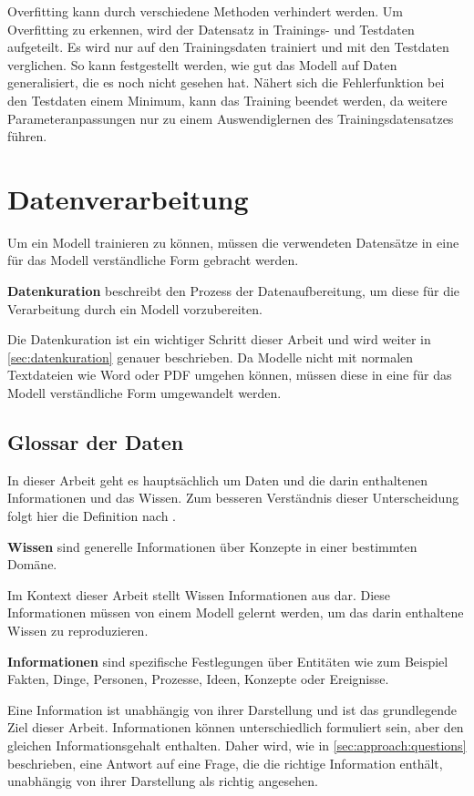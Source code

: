 Overfitting kann durch verschiedene Methoden verhindert werden.
Um Overfitting zu erkennen, wird der Datensatz in Trainings- und Testdaten aufgeteilt.
Es wird nur auf den Trainingsdaten trainiert und mit den Testdaten verglichen.
So kann festgestellt werden, wie gut das Modell auf Daten generalisiert, die es noch nicht gesehen hat.
Nähert sich die Fehlerfunktion bei den Testdaten einem Minimum, kann das Training beendet werden, da weitere Parameteranpassungen nur zu einem Auswendiglernen des Trainingsdatensatzes führen.\\


\section{Datenverarbeitung}\label{sec:datenverarbeitung}
Um ein Modell trainieren zu können, müssen die verwendeten Datensätze in eine für das Modell verständliche Form gebracht werden.
\begin{definition}\label{def:datenkuration}
    \textbf{Datenkuration} beschreibt den Prozess der Datenaufbereitung, um diese für die Verarbeitung durch ein Modell vorzubereiten.
\end{definition}
Die Datenkuration ist ein wichtiger Schritt dieser Arbeit und wird weiter in \cref{sec:datenkuration} genauer beschrieben.
Da Modelle nicht mit normalen Textdateien wie Word oder PDF umgehen können, müssen diese in eine für das Modell verständliche Form umgewandelt werden.

\subsection{Glossar der Daten}
In dieser Arbeit geht es hauptsächlich um Daten und die darin enthaltenen Informationen und das Wissen.
Zum besseren Verständnis dieser Unterscheidung folgt hier die Definition nach \citet{bb}.

\begin{definition}\label{def:wissen}
    \textbf{Wissen} sind generelle Informationen über Konzepte in einer bestimmten Domäne.
\end{definition}
Im Kontext dieser Arbeit stellt Wissen Informationen aus \citet{bb} dar.
Diese Informationen müssen von einem Modell gelernt werden, um das darin enthaltene Wissen zu reproduzieren.

\begin{definition}\label{def:information}
    \textbf{Informationen} sind spezifische Festlegungen über Entitäten wie zum Beispiel Fakten, Dinge, Personen, Prozesse, Ideen, Konzepte oder Ereignisse.
\end{definition}
Eine Information ist unabhängig von ihrer Darstellung und ist das grundlegende Ziel dieser Arbeit.
Informationen können unterschiedlich formuliert sein, aber den gleichen Informationsgehalt enthalten.
Daher wird, wie in \cref{sec:approach:questions} beschrieben, eine Antwort auf eine Frage, die die richtige Information enthält, unabhängig von ihrer Darstellung als richtig angesehen.

